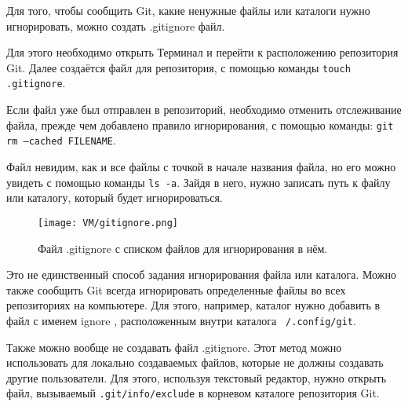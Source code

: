 Для того, чтобы сообщить Git, какие ненужные файлы или каталоги нужно игнорировать, можно создать .gitignore файл.

Для этого необходимо открыть Терминал и перейти к расположению репозитория Git. Далее создаётся файл для репозитория, с помощью команды \texttt{touch .gitignore}.

Если файл уже был отправлен в репозиторий, необходимо отменить отслеживание файла, прежде чем добавлено правило игнорирования, с помощью команды: \texttt{git rm --cached FILENAME}.

Файл невидим, как и все файлы с точкой в начале названия файла, но его можно увидеть с помощью команды \texttt{ls -a}. Зайдя в него, нужно записать путь к файлу или каталогу, который будет игнорироваться.

\begin{figure}[h]
		\centering
		\texttt{[image: VM/gitignore.png]}
\caption{Файл .gitignore с списком файлов для игнорирования в нём.}
\label{ris:image}
\end{figure}

Это не единственный способ задания игнорирования файла или каталога. Можно также сообщить Git всегда игнорировать определенные файлы во всех репозиториях на компьютере. Для этого, например, каталог нужно добавить в файл с именем ignore , расположенным внутри каталога \texttt{~/.config/git}.

Также можно вообще не создавать файл .gitignore. Этот метод можно использовать для локально создаваемых файлов, которые не должны создавать другие пользователи. Для этого, используя текстовый редактор, нужно открыть файл, вызываемый \texttt{.git/info/exclude} в корневом каталоге репозитория Git.